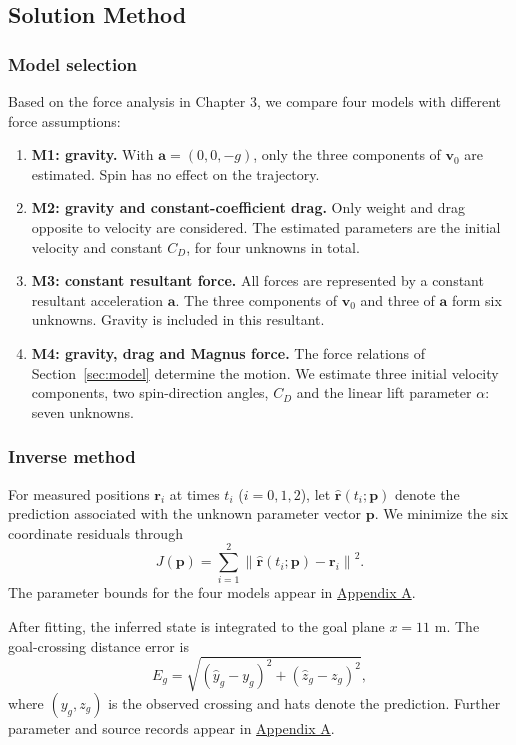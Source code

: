 \documentclass[12pt,letterpaper]{article}
\begin{document}
\subsection{Solution Method}\label{sec:inverse}
\subsubsection{Model selection}
Based on the force analysis in Chapter 3, we compare four models with different force assumptions:
\begin{enumerate}
\item \textbf{M1: gravity.} With $\boldsymbol a=(0,0,-g)$, only the three components of $\boldsymbol v_0$ are estimated. Spin has no effect on the trajectory.
\item \textbf{M2: gravity and constant-coefficient drag.} Only weight and drag opposite to velocity are considered. The estimated parameters are the initial velocity and constant $C_D$, for four unknowns in total.
\item \textbf{M3: constant resultant force.} All forces are represented by a constant resultant acceleration $\boldsymbol a$. The three components of $\boldsymbol v_0$ and three of $\boldsymbol a$ form six unknowns. Gravity is included in this resultant.
\item \textbf{M4: gravity, drag and Magnus force.} The force relations of Section~\ref{sec:model} determine the motion. We estimate three initial velocity components, two spin-direction angles, $C_D$ and the linear lift parameter $\alpha$: seven unknowns.
\end{enumerate}

\subsubsection{Inverse method}
For measured positions $\boldsymbol r_i$ at times $t_i$ ($i=0,1,2$), let $\widehat{\boldsymbol r}(t_i;\boldsymbol p)$ denote the prediction associated with the unknown parameter vector $\boldsymbol p$. We minimize the six coordinate residuals through
\[
J(\boldsymbol p)=\sum_{i=1}^{2}\left\|\widehat{\boldsymbol r}(t_i;\boldsymbol p)-\boldsymbol r_i\right\|^2.
\]
The parameter bounds for the four models appear in \hyperref[app:data]{Appendix A}.

After fitting, the inferred state is integrated to the goal plane $x=11$ m. The goal-crossing distance error is
\begin{equation}
E_g=\sqrt{(\widehat y_g-y_g)^2+(\widehat z_g-z_g)^2},
\label{eq:prediction-errors}\end{equation}
where $(y_g,z_g)$ is the observed crossing and hats denote the prediction. Further parameter and source records appear in \hyperref[app:data]{Appendix A}.
\end{document}
